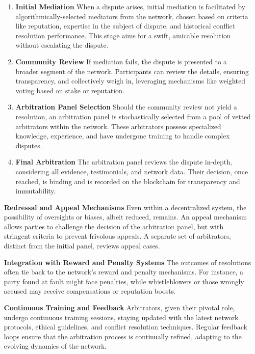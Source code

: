 \documentclass{article}
\begin{document}
\begin{enumerate}

\item \textbf{Initial Mediation}
When a dispute arises, initial mediation is facilitated by algorithmically-selected mediators from the network, chosen based on criteria like reputation, expertise in the subject of dispute, and historical conflict resolution performance. This stage aims for a swift, amicable resolution without escalating the dispute.

\item  \textbf{Community Review}
If mediation fails, the dispute is presented to a broader segment of the network. Participants can review the details, ensuring transparency, and collectively weigh in, leveraging mechanisms like weighted voting based on stake or reputation.

\item  \textbf{Arbitration Panel Selection}
Should the community review not yield a resolution, an arbitration panel is stochastically selected from a pool of vetted arbitrators within the network. These arbitrators possess specialized knowledge, experience, and have undergone training to handle complex disputes.

\item  \textbf{Final Arbitration}
The arbitration panel reviews the dispute in-depth, considering all evidence, testimonials, and network data. Their decision, once reached, is binding and is recorded on the blockchain for transparency and immutability.

\end{enumerate}

\textbf{Redressal and Appeal Mechanisms}
Even within a decentralized system, the possibility of oversights or biases, albeit reduced, remains. An appeal mechanism allows parties to challenge the decision of the arbitration panel, but with stringent criteria to prevent frivolous appeals. A separate set of arbitrators, distinct from the initial panel, reviews appeal cases.

\textbf{Integration with Reward and Penalty Systems}
The outcomes of resolutions often tie back to the network's reward and penalty mechanisms. For instance, a party found at fault might face penalties, while whistleblowers or those wrongly accused may receive compensations or reputation boosts.

\textbf{Continuous Training and Feedback}
Arbitrators, given their pivotal role, undergo continuous training sessions, staying updated with the latest network protocols, ethical guidelines, and conflict resolution techniques. Regular feedback loops ensure that the arbitration process is continually refined, adapting to the evolving dynamics of the network.
\end{document}
